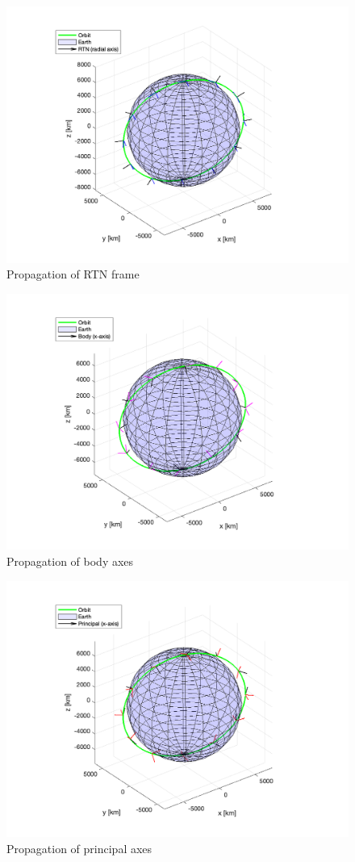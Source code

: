\begin{figure}[H]
\centering
\includegraphics[scale=0.7]{Images/ps3_problem7c_rtn.png}
\caption{Propagation of RTN frame}
\label{fig:ps3_problem7c_rtn}
\end{figure}

\begin{figure}[H]
\centering
\includegraphics[scale=0.7]{Images/ps3_problem7c_body.png}
\caption{Propagation of body axes}
\label{fig:ps3_problem7c_body}
\end{figure}

\begin{figure}[H]
\centering
\includegraphics[scale=0.7]{Images/ps3_problem7c_principal.png}
\caption{Propagation of principal axes}
\label{fig:ps3_problem7c_principal}
\end{figure}